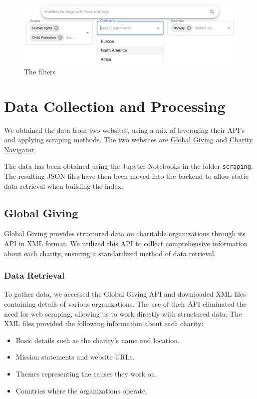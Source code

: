\documentclass[unicode,9pt,a4paper,oneside,numbers=endperiod,openany]{scrartcl}
\begin{document}
\begin{figure}[h]
    \centering
    \includegraphics[width=0.6\linewidth]{fig/filters.png}
    \caption{The filters}
\end{figure}

\section{Data Collection and Processing}

We obtained the data from two websites, using a mix of leveraging their API's and applying scraping methods.
The two websites are \href{https://www.globalgiving.org}{Global Giving} and \href{https://www.charitynavigator.org}{Charity Navigator}.

The data has been obtained using the Jupyter Notebooks in the folder \texttt{scraping}. The resulting JSON files have then been moved into the backend to allow static data retrieval when building the index.


\subsection{Global Giving}
Global Giving provides structured data on charitable organizations through its API in XML format. We utilized this API to collect comprehensive information about each charity, ensuring a standardized method of data retrieval.

\subsubsection{Data Retrieval}
To gather data, we accessed the Global Giving API and downloaded XML files containing details of various organizations. The use of their API eliminated the need for web scraping, allowing us to work directly with structured data. The XML files provided the following information about each charity:
\begin{itemize}
\item Basic details such as the charity's name and location.
\item Mission statements and website URLs.
\item Themes representing the causes they work on.
\item Countries where the organizations operate.
\end{itemize}
\end{document}
